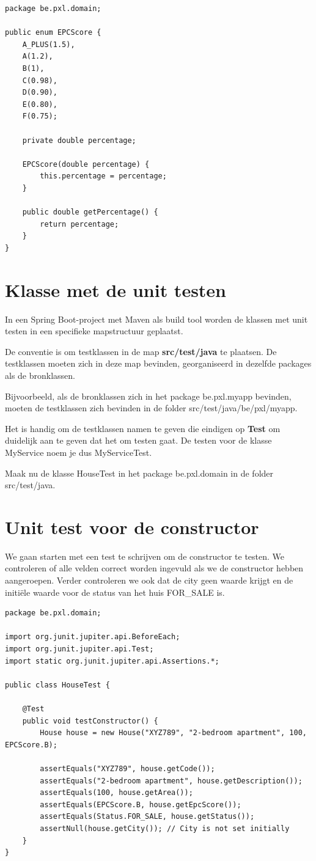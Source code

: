 \begin{lstlisting}
package be.pxl.domain;

public enum EPCScore {
	A_PLUS(1.5),
	A(1.2),
	B(1),
	C(0.98),
	D(0.90),
	E(0.80),
	F(0.75);

	private double percentage;

	EPCScore(double percentage) {
		this.percentage = percentage;
	}

	public double getPercentage() {
		return percentage;
	}
}
\end{lstlisting}


\section{Klasse met de unit testen}

In een Spring Boot-project met Maven als build tool worden de klassen met unit testen in een specifieke mapstructuur geplaatst. 

De conventie is om testklassen in de map \textbf{src/test/java} te plaatsen.  De testklassen moeten zich in deze map bevinden, georganiseerd in dezelfde packages als de bronklassen.

Bijvoorbeeld, als de bronklassen zich in het package be.pxl.myapp bevinden, moeten de testklassen zich bevinden in de folder src/test/java/be/pxl/myapp.

Het is handig om de testklassen namen te geven die eindigen op \textbf{Test} om duidelijk aan te geven dat het om testen gaat. De testen voor de klasse MyService noem je dus MyServiceTest.

Maak nu de klasse HouseTest in het package be.pxl.domain in de folder src/test/java.

\section{Unit test voor de constructor}

We gaan starten met een test te schrijven om de constructor te testen.  We controleren of alle velden correct worden ingevuld als we de constructor hebben aangeroepen.  Verder controleren we ook dat de city geen waarde krijgt en de initi\"ele waarde voor de status van het huis FOR\_SALE is.

\begin{lstlisting}
package be.pxl.domain;

import org.junit.jupiter.api.BeforeEach;
import org.junit.jupiter.api.Test;
import static org.junit.jupiter.api.Assertions.*;

public class HouseTest {
    
    @Test
    public void testConstructor() {
        House house = new House("XYZ789", "2-bedroom apartment", 100, EPCScore.B);

        assertEquals("XYZ789", house.getCode());
        assertEquals("2-bedroom apartment", house.getDescription());
        assertEquals(100, house.getArea());
        assertEquals(EPCScore.B, house.getEpcScore());
        assertEquals(Status.FOR_SALE, house.getStatus());
        assertNull(house.getCity()); // City is not set initially
    }
}
\end{lstlisting}


